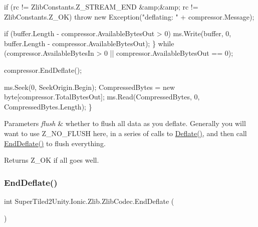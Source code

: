 \begin{DoxyCode}
        \textcolor{keywordflow}{if} (rc != ZlibConstants.Z\_STREAM\_END &amp;&amp; rc != ZlibConstants.Z\_OK)
            \textcolor{keywordflow}{throw} \textcolor{keyword}{new} Exception(\textcolor{stringliteral}{"deflating: "} + compressor.Message);

        \textcolor{keywordflow}{if} (buffer.Length - compressor.AvailableBytesOut > 0)
            ms.Write(buffer, 0, buffer.Length - compressor.AvailableBytesOut);
    \}
    \textcolor{keywordflow}{while} (compressor.AvailableBytesIn > 0 || compressor.AvailableBytesOut == 0);

    compressor.EndDeflate();

    ms.Seek(0, SeekOrigin.Begin);
    CompressedBytes = \textcolor{keyword}{new} byte[compressor.TotalBytesOut];
    ms.Read(CompressedBytes, 0, CompressedBytes.Length);
\}
\end{DoxyCode}
 


\begin{DoxyParams}{Parameters}
{\em flush} & whether to flush all data as you deflate. Generally you will want to use Z\+\_\+\+N\+O\+\_\+\+F\+L\+U\+SH here, in a series of calls to \mbox{\hyperlink{class_super_tiled2_unity_1_1_ionic_1_1_zlib_1_1_zlib_codec_afeb80a3bb4f9bfdbe76e7364d617808c}{Deflate()}}, and then call \mbox{\hyperlink{class_super_tiled2_unity_1_1_ionic_1_1_zlib_1_1_zlib_codec_af27aed7df6b5594215c311219d56ee35}{End\+Deflate()}} to flush everything. \\
\hline
\end{DoxyParams}
\begin{DoxyReturn}{Returns}
Z\+\_\+\+OK if all goes well.
\end{DoxyReturn}
\mbox{\label{class_super_tiled2_unity_1_1_ionic_1_1_zlib_1_1_zlib_codec_af27aed7df6b5594215c311219d56ee35}} 
\subsubsection{\texorpdfstring{End\+Deflate()}{EndDeflate()}}
{\footnotesize\ttfamily int Super\+Tiled2\+Unity.\+Ionic.\+Zlib.\+Zlib\+Codec.\+End\+Deflate (\begin{DoxyParamCaption}{ }\end{DoxyParamCaption})}



